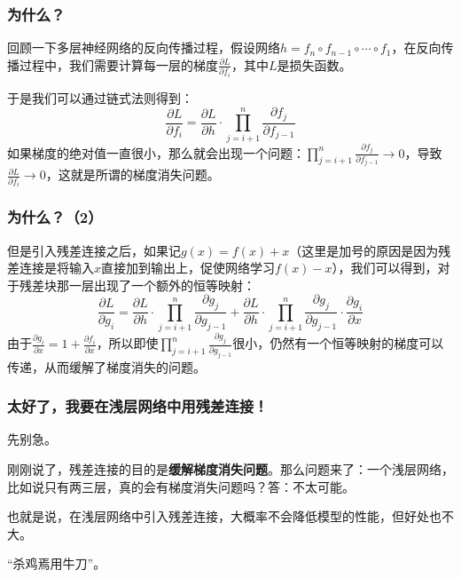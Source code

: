 \documentclass[fontset=none]{ctexbeamer}
\begin{document}
\begin{frame}
    \frametitle{为什么？}

    回顾一下多层神经网络的反向传播过程，假设网络$h = f_n \circ f_{n-1} \circ \cdots \circ f_1$，在反向传播过程中，我们需要计算每一层的梯度$\frac{\partial L}{\partial f_i}$，其中$L$是损失函数。

    于是我们可以通过链式法则得到：
\begin{equation}
\frac{\partial L}{\partial f_i} = \frac{\partial L}{\partial h} \cdot \prod_{j=i+1}^{n} \frac{\partial f_j}{\partial f_{j-1}}
\end{equation}
如果梯度的绝对值一直很小，那么就会出现一个问题：$\prod_{j=i+1}^{n} \frac{\partial f_j}{\partial f_{j-1}} \rightarrow 0$，导致$\frac{\partial L}{\partial f_i} \rightarrow 0$，这就是所谓的梯度消失问题。
    
\end{frame}

\begin{frame}
    \frametitle{为什么？（2）}

    但是引入残差连接之后，如果记$g(x) = f(x) + x$（这里是加号的原因是因为残差连接是将输入$x$直接加到输出上，促使网络学习$f(x) - x$），我们可以得到，对于残差块那一层出现了一个额外的恒等映射：
\begin{equation}
\frac{\partial L}{\partial g_i} = \frac{\partial L}{\partial h} \cdot \prod_{j=i+1}^{n} \frac{\partial g_j}{\partial g_{j-1}} + \frac{\partial L}{\partial h} \cdot \prod_{j=i+1}^{n} \frac{\partial g_j}{\partial g_{j-1}} \cdot \frac{\partial g_i}{\partial x}
\end{equation}
由于$\frac{\partial g_i}{\partial x} = 1 + \frac{\partial f_i}{\partial x}$，所以即使$\prod_{j=i+1}^{n} \frac{\partial g_j}{\partial g_{j-1}}$很小，仍然有一个恒等映射的梯度可以传递，从而缓解了梯度消失的问题。

\end{frame}

\begin{frame}
    \frametitle{太好了，我要在浅层网络中用残差连接！}

    先别急。

    刚刚说了，残差连接的目的是\textbf{缓解梯度消失问题}。那么问题来了：一个浅层网络，比如说只有两三层，真的会有梯度消失问题吗？答：不太可能。

    也就是说，在浅层网络中引入残差连接，大概率不会降低模型的性能，但好处也不大。

    “杀鸡焉用牛刀”。

\end{frame}
\end{document}

